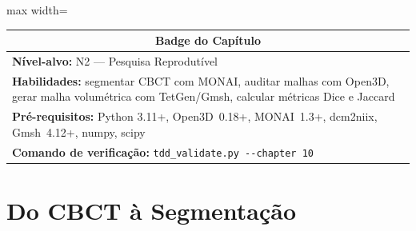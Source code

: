 
\begin{center}
\begin{minipage}{0.85\textwidth}
\begin{adjustbox}{max width=\textwidth}
\begin{tabular}{|p{}|}
\hline
\multicolumn{1}{|c|}{\textbf{\large Badge do Capítulo}} \\
\hline
\textbf{Nível-alvo:} N2 — Pesquisa Reprodutível \\
\textbf{Habilidades:} segmentar CBCT com MONAI, auditar malhas com Open3D,
gerar malha volumétrica com TetGen/Gmsh, calcular métricas Dice e Jaccard \\
\textbf{Pré-requisitos:} Python 3.11+, Open3D~0.18+, MONAI~1.3+, dcm2niix,
Gmsh~4.12+, numpy, scipy \\
\textbf{Comando de verificação:} \verb|tdd_validate.py --chapter 10| \\
\hline
\end{tabular}
\end{adjustbox}
\end{minipage}
\end{center}


\label{ch:pipeline}%

\section{Do CBCT à Segmentação}
\label{sec:cbct-segmentacao}

